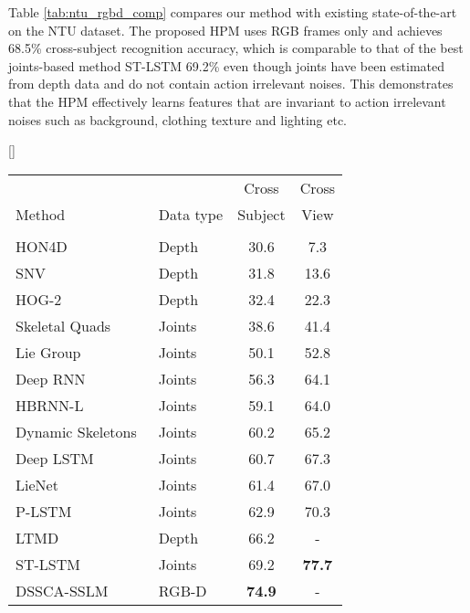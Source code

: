 \documentclass[twocolumn]{svjour3}          \smartqed  \usepackage{graphicx}
\begin{document}
Table \ref{tab:ntu_rgbd_comp} compares our method with existing state-of-the-art on the NTU dataset. The proposed HPM uses RGB frames only and achieves 68.5\% cross-subject recognition accuracy, which is comparable to that of the best joints-based method ST-LSTM\citep{liu2016spatio} 69.2\% even though joints have been estimated from depth data and do not contain action irrelevant noises. This demonstrates that the HPM effectively learns features that are invariant to action irrelevant noises such as background, clothing texture and lighting etc.


\begin{table*}
[\FBwidth]
{\caption{Action recognition accuracy (\%) on the NTU RGB+D Human Activity Dataset. Our RGB only (HPM+Traj) accuracies are higher than the nearest competitors which use RGB-D or Joints data. Our RGB-D method (HPM+ HPM+Traj) outperforms all methods by significant margins in both settings}
\label{tab:ntu_rgbd_comp}}
{
\begin{tabular}{llcc}
\hline\noalign{\smallskip}
\multicolumn{1}{c}{} &  & Cross & Cross \\
Method & Data type & Subject & View \\
\noalign{\smallskip}\hline\noalign{\smallskip}
\multicolumn{ 3}{c}{\textbf{Baseline}} &  \\ \noalign{\smallskip}\hline\noalign{\smallskip}

HON4D~\citep{HON4D} & Depth & 30.6 & 7.3 \\ SNV~\citep{yang2014super} & Depth & 31.8 & 13.6 \\ HOG-2~\citep{ohn2013joint} & Depth & 32.4 & 22.3 \\ Skeletal Quads~\citep{evangelidis2014skeletal} & Joints & 38.6 & 41.4 \\ Lie Group~\citep{vemulapalli2014human} & Joints & 50.1 & 52.8 \\ Deep RNN~\citep{shahroudy2016ntu} & Joints & 56.3 & 64.1 \\ HBRNN-L~\citep{du2015hierarchical} & Joints & 59.1 & 64.0 \\ Dynamic Skeletons~\citep{hu2015jointly} & Joints & 60.2 & 65.2 \\ Deep LSTM~\citep{shahroudy2016ntu} & Joints & 60.7 & 67.3 \\ LieNet~\citep{huang2016deep} & Joints & 61.4 & 67.0 \\
P-LSTM~\citep{shahroudy2016ntu} & Joints & 62.9 & 70.3 \\ LTMD~\citep{luo2017unsupervised} & Depth & 66.2 & - \\
ST-LSTM~\citep{liu2016spatio} & Joints & 69.2 & \textbf{77.7} \\ DSSCA-SSLM~\citep{shahroudy2017deep} & RGB-D & \textbf{74.9} & - \\ 





\end{tabular}}
\end{table*}
\end{document}
